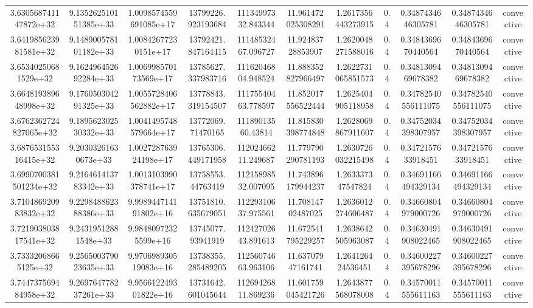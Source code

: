 \begin{table}
\begin{tabular}{ccccccccccc}
3.630568741147872e+32 & 9.135262510151385e+33 & 1.0098574559691085e+17 & 13799226.923193684 & 11134997332.843344 & 11.961472025308291 & 1.2617356443273915 & 0.4 & 0.3487434646305781 & 0.3487434646305781 & convective \\
3.641985623981581e+32 & 9.148900578101182e+33 & 1.00842677230151e+17 & 13792421.847164415 & 11148532467.096727 & 11.92483728853907 & 1.2620048271588016 & 0.4 & 0.3484369670440564 & 0.3484369670440564 & convective \\
3.65340250681529e+32 & 9.162496452692284e+33 & 1.006998570173569e+17 & 13785627.337983716 & 11162046804.948524 & 11.888352827966497 & 1.2622731065851573 & 0.4 & 0.3481309469678382 & 0.3481309469678382 & convective \\
3.664819389648998e+32 & 9.176050304291325e+33 & 1.0055728406562882e+17 & 13778843.319154507 & 11175540463.778597 & 11.852017556522444 & 1.2625404905118958 & 0.4 & 0.34782540556111075 & 0.34782540556111075 & convective \\
3.6762362724827065e+32 & 9.189562302530332e+33 & 1.0041495748579664e+17 & 13772069.71470165 & 11189013560.43814 & 11.815830398774848 & 1.2628069867911607 & 0.4 & 0.34752034398307957 & 0.34752034398307957 & convective \\
3.687653155316415e+32 & 9.20303261630673e+33 & 1.002728763924198e+17 & 13765306.449171958 & 11202466211.249687 & 11.779790290781193 & 1.2630726032215498 & 0.4 & 0.3472157633918451 & 0.3472157633918451 & convective \\
3.6990700381501234e+32 & 9.216461413783342e+33 & 1.0013103990378741e+17 & 13758553.44763419 & 11215898532.007095 & 11.743896179944237 & 1.263337347547824 & 0.4 & 0.34691166494329134 & 0.34691166494329134 & convective \\
3.710486920983832e+32 & 9.229848862388386e+33 & 9.998944714191802e+16 & 13751810.635679051 & 11229310637.975561 & 11.70814702487025 & 1.2636012274606487 & 0.4 & 0.34660804979000726 & 0.34660804979000726 & convective \\
3.721903803817541e+32 & 9.24319512881548e+33 & 9.98480972325599e+16 & 13745077.93941919 & 11242702643.891613 & 11.672541795229257 & 1.2638642505963087 & 0.4 & 0.34630491908022465 & 0.34630491908022465 & convective \\
3.73332068665125e+32 & 9.256500379023635e+33 & 9.970698930519083e+16 & 13738355.285489205 & 11256074663.963106 & 11.63707947161741 & 1.264126424536451 & 0.4 & 0.34600227395678296 & 0.34600227395678296 & convective \\
3.744737569484958e+32 & 9.269764778237261e+33 & 9.956612249301822e+16 & 13731642.601045644 & 11269426811.869236 & 11.601759045421726 & 1.2643877568078008 & 0.4 & 0.34570011555611163 & 0.34570011555611163 & convective \\

\end{tabular}
\end{table}
